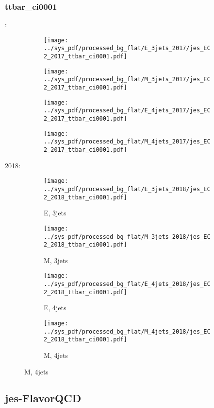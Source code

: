 \documentclass{beamer}
\begin{document}
\begin{frame}
\frametitle{ttbar_ci0001}
\fontsize{5}{1}:
\begin{figure}
\centering
\begin{subfigure}[b]{0.24\textwidth}
\texttt{[image: ../sys\_pdf/processed\_bg\_flat/E\_3jets\_2017/jes\_EC2\_2017\_ttbar\_ci0001.pdf]}
\end{subfigure}
\begin{subfigure}[b]{0.24\textwidth}
\texttt{[image: ../sys\_pdf/processed\_bg\_flat/M\_3jets\_2017/jes\_EC2\_2017\_ttbar\_ci0001.pdf]}
\end{subfigure}
\begin{subfigure}[b]{0.24\textwidth}
\texttt{[image: ../sys\_pdf/processed\_bg\_flat/E\_4jets\_2017/jes\_EC2\_2017\_ttbar\_ci0001.pdf]}
\end{subfigure}
\begin{subfigure}[b]{0.24\textwidth}
\texttt{[image: ../sys\_pdf/processed\_bg\_flat/M\_4jets\_2017/jes\_EC2\_2017\_ttbar\_ci0001.pdf]}
\end{subfigure}
\end{figure}
2018:
\begin{figure}
\centering
\begin{subfigure}[b]{0.24\textwidth}
\texttt{[image: ../sys\_pdf/processed\_bg\_flat/E\_3jets\_2018/jes\_EC2\_2018\_ttbar\_ci0001.pdf]}
\captionsetup{font=tiny}
\caption{E, 3jets}
\end{subfigure}
\begin{subfigure}[b]{0.24\textwidth}
\texttt{[image: ../sys\_pdf/processed\_bg\_flat/M\_3jets\_2018/jes\_EC2\_2018\_ttbar\_ci0001.pdf]}
\captionsetup{font=tiny}
\caption{M, 3jets}
\end{subfigure}
\begin{subfigure}[b]{0.24\textwidth}
\texttt{[image: ../sys\_pdf/processed\_bg\_flat/E\_4jets\_2018/jes\_EC2\_2018\_ttbar\_ci0001.pdf]}
\captionsetup{font=tiny}
\caption{E, 4jets}
\end{subfigure}
\begin{subfigure}[b]{0.24\textwidth}
\texttt{[image: ../sys\_pdf/processed\_bg\_flat/M\_4jets\_2018/jes\_EC2\_2018\_ttbar\_ci0001.pdf]}
\captionsetup{font=tiny}
\caption{M, 4jets}
\end{subfigure}
\end{figure}
\end{frame}


\subsection{jes-FlavorQCD}
\end{document}
